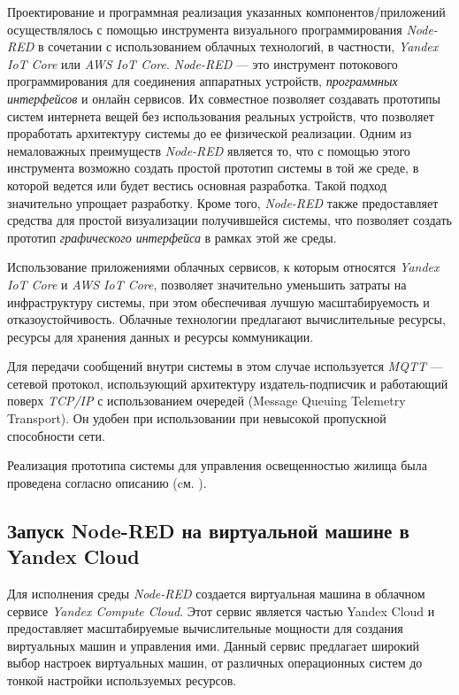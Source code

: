 Проектирование и программная реализация указанных компонентов/приложений осуществлялось с помощью инструмента  визуального программирования \textit{Node-RED} в сочетании с использованием облачных технологий, в частности, \textit{Yandex IoT Core} или \textit{AWS IoT Core}. \textit{Node-RED} --- это инструмент потокового программирования для соединения аппаратных устройств, \textit{программных интерфейсов} и онлайн сервисов. Их совместное позволяет создавать прототипы систем интернета вещей без использования реальных устройств, что позволяет проработать архитектуру системы до ее физической реализации. Одним из немаловажных преимуществ \textit{Node-RED} является то, что с помощью этого инструмента возможно создать простой прототип системы в той же среде, в которой ведется или будет вестись основная разработка. Такой подход значительно упрощает разработку. Кроме того, \textit{Node-RED} также предоставляет средства для простой визуализации получившейся системы, что позволяет создать прототип \textit{графического интерфейса} в рамках этой же среды.

Использование приложениями облачных сервисов, к которым относятся \textit{Yandex IoT Core} и \textit{AWS IoT Core}, позволяет значительно уменьшить затраты на инфраструктуру системы, при этом обеспечивая лучшую масштабируемость и отказоустойчивость. Облачные технологии предлагают вычислительные ресурсы, ресурсы для хранения данных и ресурсы коммуникации.

Для передачи сообщений внутри системы в этом случае используется \textit{MQTT} --- сетевой протокол, использующий архитектуру издатель-подписчик и работающий поверх \textit{TCP/IP} с использованием очередей (Message Queuing Telemetry Transport). Он удобен при использовании при невысокой  пропускной способности сети.

Реализация прототипа системы для управления освещенностью жилища была проведена согласно описанию (cм. ).

\subsection{Запуск Node-RED на виртуальной машине в Yandex Cloud}
\label{sec_SH_tec_impl_node_red_launch}

Для исполнения среды \textit{Node-RED} создается виртуальная машина в облачном сервисе \textit{Yandex Compute Cloud}. Этот сервис является частью Yandex Cloud и предоставляет масштабируемые вычислительные мощности для создания виртуальных машин и управления ими. Данный сервис предлагает широкий выбор настроек виртуальных машин, от различных операционных систем до тонкой настройки используемых ресурсов.

